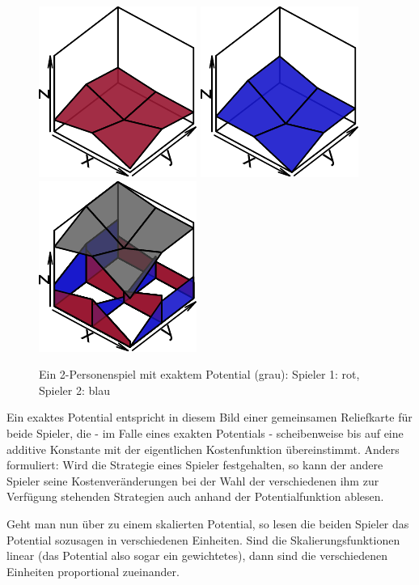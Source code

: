 \begin{figure}[h]\centering
	\includegraphics[width=.3\textwidth]{../Bilder/exaktesPotentialSp1.pdf}
	\includegraphics[width=.3\textwidth]{../Bilder/exaktesPotentialSp2.pdf}
	\includegraphics[width=.3\textwidth]{../Bilder/exaktesPotential.pdf}
	\caption{Ein 2-Personenspiel mit exaktem Potential (grau): Spieler 1: rot, Spieler 2: blau \\}
\end{figure}

Ein exaktes Potential entspricht in diesem Bild einer gemeinsamen Reliefkarte für beide Spieler, die - im Falle eines exakten Potentials - \glqq scheibenweise\grqq{} bis auf eine additive Konstante mit der eigentlichen Kostenfunktion übereinstimmt. Anders formuliert: Wird die Strategie eines Spieler festgehalten, so kann der andere Spieler seine Kostenveränderungen bei der Wahl der verschiedenen ihm zur Verfügung stehenden Strategien auch anhand der Potentialfunktion ablesen. 

Geht man nun über zu einem skalierten Potential, so lesen die beiden Spieler das Potential sozusagen in verschiedenen Einheiten. Sind die Skalierungsfunktionen linear (das Potential also sogar ein gewichtetes), dann sind die verschiedenen Einheiten proportional zueinander. 


